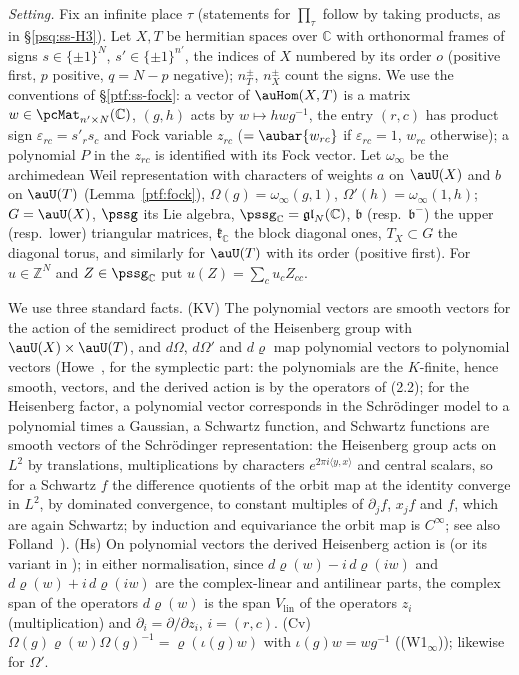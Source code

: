 \documentclass[10pt]{amsart}
\theoremstyle{definition}
\theoremstyle{remark}
\newcommand{\C}{\mathbb C}
\newcommand{\Z}{\mathbb Z}
\begin{document}
\emph{Setting.} Fix an infinite place $\tau$ (statements for $\prod_\tau$ follow by taking products,
as in \S\ref{psq:ss-H3}). Let $X,T$ be hermitian spaces over $\C$ with orthonormal frames of signs
$s\in\{\pm1\}^{N}$, $s'\in\{\pm1\}^{n'}$, the indices of $X$ numbered by its order $o$ (positive
first, $p$ positive, $q=N-p$ negative); $n_T^\pm$, $n_X^\pm$ count the signs. We use the conventions of
\S\ref{ptf:ss-fock}: a vector of $\auHom(X,T)$ is a matrix $w\in\pcMat_{n'\times N}(\C)$, $(g,h)$ acts
by $w\mapsto hwg^{-1}$, the entry $(r,c)$ has product sign $\varepsilon_{rc}=s'_rs_c$ and Fock variable
$z_{rc}$ ($=\aubar{w_{rc}}$ if $\varepsilon_{rc}=1$, $w_{rc}$ otherwise); a polynomial $P$ in the $z_{rc}$
is identified with its Fock vector. Let $\omega_\infty$ be the archimedean Weil representation with
characters of weights $a$ on $\auU(X)$ and $b$ on $\auU(T)$ (Lemma~\ref{ptf:fock}),
$\Omega(g)=\omega_\infty(g,1)$, $\Omega'(h)=\omega_\infty(1,h)$; $G=\auU(X)$, $\pssg$ its Lie algebra,
$\pssg_\C=\mathfrak{gl}_N(\C)$, $\mathfrak b$ (resp.\ $\mathfrak b^-$) the upper (resp.\ lower)
triangular matrices, $\mathfrak k_\C$ the block diagonal ones, $T_X\subset G$ the diagonal torus, and
similarly for $\auU(T)$ with its order (positive first). For $u\in\Z^N$ and $Z\in\pssg_\C$ put
$u(Z)=\sum_cu_cZ_{cc}$.

We use three standard facts. (KV) The polynomial vectors are smooth vectors for the action of the
semidirect product of the Heisenberg group with $\auU(X)\times\auU(T)$, and $d\Omega$, $d\Omega'$ and
$d\varrho$ map polynomial vectors to polynomial vectors (Howe~\cite[(2.2)--(2.3)]{HoweJAMS}, for the symplectic part: the polynomials are the $K$-finite, hence smooth, vectors, and the derived action is by the operators of (2.2); for the Heisenberg factor, a polynomial vector corresponds in the Schr\"odinger model to a polynomial times a Gaussian, a Schwartz function, and Schwartz functions are smooth vectors of the Schr\"odinger representation: the Heisenberg group acts on $L^2$ by translations, multiplications by characters $e^{2\pi i\langle y,x\rangle}$ and central scalars, so for a Schwartz $f$ the difference quotients of the orbit map at the identity converge in $L^2$, by dominated convergence, to constant multiples of $\partial_jf$, $x_jf$ and $f$, which are again Schwartz; by induction and equivariance the orbit map is $C^\infty$; see also Folland~\cite{FollandPS}). (Hs) On polynomial vectors the derived Heisenberg action is
{\cite[(32)]{P53}} (or its variant in {\cite[Remark~4.23]{P53}}); in either normalisation, since
$d\varrho(w)-i\,d\varrho(iw)$ and $d\varrho(w)+i\,d\varrho(iw)$ are the complex-linear and antilinear parts,
the complex span of the operators $d\varrho(w)$ is the span $V_{\mathrm{lin}}$ of the operators $z_i$
(multiplication) and $\partial_i=\partial/\partial z_i$, $i=(r,c)$. (Cv) $\Omega(g)\varrho(w)\Omega(g)^{-1}=
\varrho(\iota(g)w)$ with $\iota(g)w=wg^{-1}$ ((W1$_\infty$)); likewise for $\Omega'$.
\end{document}
